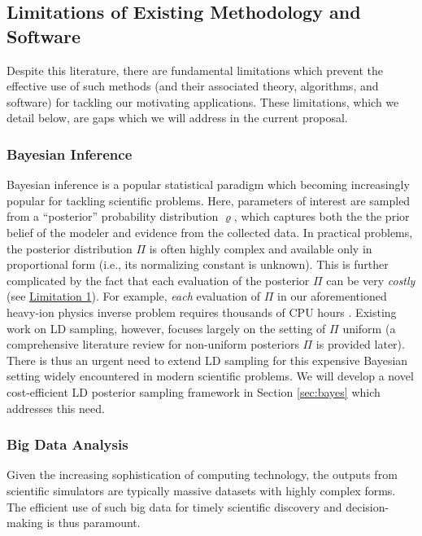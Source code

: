 \documentclass[11pt]{NSFamsart}
\newcommand{\Limone}{\hyperlink{Lim1link}{Limitation 1}\xspace}
\begin{document}
\subsection{Limitations of Existing Methodology and Software} \label{sec:limit}

Despite this literature, there are fundamental limitations which prevent the effective use of such methods (and their associated theory, algorithms, and software) for tackling our motivating applications. These limitations, which we detail below, are gaps which we will address in the current proposal.

\subsubsection{Bayesian Inference} Bayesian inference \citep{gelman1995bayesian} is a popular statistical paradigm which becoming increasingly popular for tackling scientific problems. Here, parameters of interest are sampled from a ``posterior'' probability distribution $\varrho$, which captures both the the prior belief of the modeler and evidence from the collected data. In practical problems, the posterior distribution $\Pi$ is often highly complex and available only in proportional form (i.e., its normalizing constant is unknown). This is further complicated by the fact that each evaluation of the posterior $\Pi$ can be very \textit{costly} (see \Limone). For example, \textit{each} evaluation of $\Pi$ in our aforementioned heavy-ion physics inverse problem requires thousands of CPU hours \cite{everett2021multisystem}. Existing work on LD sampling, however, focuses largely on the setting of $\Pi$ uniform (a comprehensive literature review for non-uniform posteriors $\Pi$ is provided later). There is thus an urgent need to extend LD sampling for this expensive Bayesian setting widely encountered in modern scientific problems. We will develop a novel cost-efficient LD posterior sampling framework in Section \ref{sec:bayes} which addresses this need.

\subsubsection{Big Data Analysis} Given the increasing sophistication of computing technology, the outputs from scientific simulators are typically massive datasets with highly complex forms. The efficient use of such big data for timely scientific discovery and decision-making is thus paramount. 
\end{document}
